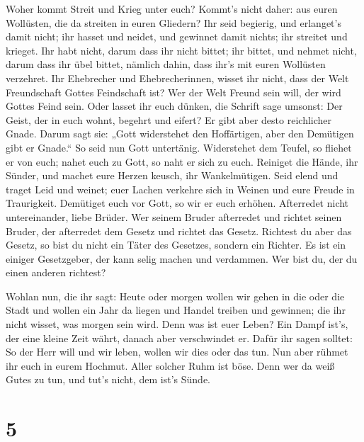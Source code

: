  Woher kommt Streit und Krieg unter euch? Kommt's nicht
daher: aus euren Wollüsten, die da streiten in euren Gliedern?
 Ihr seid begierig, und erlanget's damit nicht; ihr hasset
und neidet, und gewinnet damit nichts; ihr streitet und krieget. Ihr
habt nicht, darum dass ihr nicht bittet;  ihr bittet, und
nehmet nicht, darum dass ihr übel bittet, nämlich dahin, dass ihr's mit
euren Wollüsten verzehret.  Ihr Ehebrecher und
Ehebrecherinnen, wisset ihr nicht, dass der Welt Freundschaft Gottes
Feindschaft ist? Wer der Welt Freund sein will, der wird Gottes Feind
sein.  Oder lasset ihr euch dünken, die Schrift sage
umsonst: Der Geist, der in euch wohnt, begehrt und eifert?
 Er gibt aber desto reichlicher Gnade. Darum sagt sie:
„Gott widerstehet den Hoffärtigen, aber den Demütigen gibt er Gnade.``
 So seid nun Gott untertänig. Widerstehet dem Teufel, so
fliehet er von euch;  nahet euch zu Gott, so naht er sich
zu euch. Reiniget die Hände, ihr Sünder, und machet eure Herzen keusch,
ihr Wankelmütigen.  Seid elend und traget Leid und weinet;
euer Lachen verkehre sich in Weinen und eure Freude in Traurigkeit.
 Demütiget euch vor Gott, so wir er euch erhöhen.
 Afterredet nicht untereinander, liebe Brüder. Wer seinem
Bruder afterredet und richtet seinen Bruder, der afterredet dem Gesetz
und richtet das Gesetz. Richtest du aber das Gesetz, so bist du nicht
ein Täter des Gesetzes, sondern ein Richter.  Es ist ein
einiger Gesetzgeber, der kann selig machen und verdammen. Wer bist du,
der du einen anderen richtest?

 Wohlan nun, die ihr sagt: Heute oder morgen wollen wir
gehen in die oder die Stadt und wollen ein Jahr da liegen und Handel
treiben und gewinnen;  die ihr nicht wisset, was morgen
sein wird. Denn was ist euer Leben? Ein Dampf ist's, der eine kleine
Zeit währt, danach aber verschwindet er.  Dafür ihr sagen
solltet: So der Herr will und wir leben, wollen wir dies oder das tun.
 Nun aber rühmet ihr euch in eurem Hochmut. Aller solcher
Ruhm ist böse.  Denn wer da weiß Gutes zu tun, und tut's
nicht, dem ist's Sünde.

\hypertarget{section-4}{%
\section{5}\label{section-4}}

